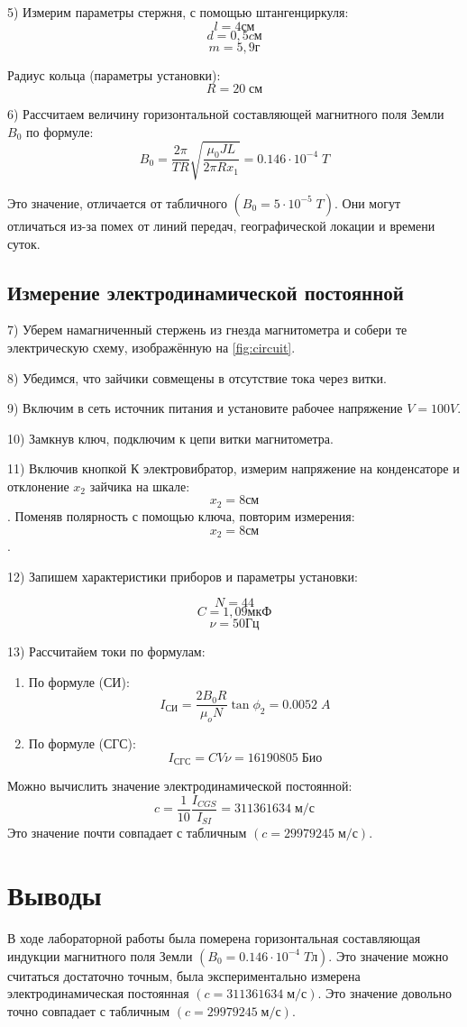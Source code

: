 \documentclass[11pt]{article}
\begin{document}
5) Измерим параметры стержня, с помощью штангенциркуля:
\[ l = 4 см\]
\[ d = 0,5 cм\]
\[ m = 5,9 г\]

Радиус кольца (параметры установки):
\[ R = 20\; см \]

6) Рассчитаем величину горизонтальной составляющей магнитного поля Земли \(B_0\) по формуле:
\[ B_0 = \frac{2\pi}{TR}\sqrt{\frac{\mu_0JL}{2\pi Rx_1}} = 0.146\cdot10^{-4}\; T \]

Это значение, отличается от табличного \((B_0 = 5\cdot10^{-5}\; T)\). Они могут отличаться из-за помех от линий передач, географической локации и времени суток.

\subsection{Измерение электродинамической постоянной}

7) Уберем намагниченный стержень из гнезда магнитометра и собери
те электрическую схему, изображённую на \ref{fig:circuit}.

8) Убедимся, что зайчики совмещены в отсутствие тока через витки.

9) Включим в сеть источник питания и установите рабочее напряжение \( V = 100V \).

10) Замкнув ключ, подключим к цепи витки магнитометра.

11) Включив кнопкой К электровибратор, измерим напряжение на конденсаторе и отклонение \(x_2\) зайчика на шкале: \[ x_2 = 8см \]. Поменяв полярность с помощью ключа, повторим измерения: \[ x_2 = 8см \].

12) Запишем характеристики приборов и параметры установки:

\[ N = 44\]
\[ C = 1,09 мкФ\]
\[ \nu = 50 Гц\]

13) Рассчитайем токи по формулам:

\begin{enumerate}
    \item По формуле (СИ):
    \[ I_{СИ} = \frac{2B_0R}{\mu_oN}\tan{\phi_2} = 0.0052\; A \]  
    \item По формуле (СГС):
    \[ I_{СГС} = CV\nu = 16190805\; Био \]
\end{enumerate}

Можно вычислить значение электродинамической постоянной:
\[ c = \frac{1}{10}\frac{I_{CGS}}{I_{SI}} = 311361634\; м/с \]
Это значение почти совпадает с табличным \( (c = 29979245\; м/с)\).

\section{Выводы}
В ходе лабораторной работы была померена горизонтальная составляющая индукции магнитного поля Земли \( (B_0 = 0.146\cdot10^{-4}\; Tл) \). Это значение можно считаться достаточно точным, была экспериментально измерена электродинамическая постоянная \((c = 311361634\; м/с)\). Это значение довольно точно совпадает с табличным \( (c = 29979245\; м/с) \).
\end{document}
